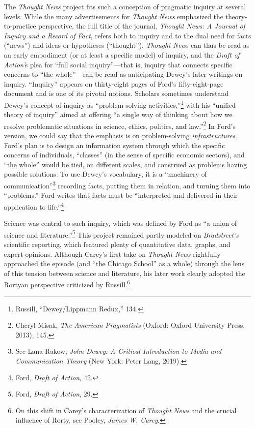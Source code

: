 \documentclass[openany,nobib]{tufte-book}
\begin{document}
The \emph{Thought News} project fits such a conception of pragmatic
inquiry at several levels. While the many advertisements for
\emph{Thought News} emphasized the theory-to-practice perspective, the
full title of the journal, \emph{Thought News: A Journal of Inquiry and
a Record of Fact}, refers both to inquiry and to the dual need for facts
(``news'') and ideas or hypotheses (``thought''). \emph{Thought New}s
can thus be read as an early embodiment (or at least a specific model)
of inquiry, and the \emph{Draft of Action'}s plea for ``full social
inquiry''---that is, inquiry that connects specific concerns to ``the
whole''---can be read as anticipating Dewey's later writings on inquiry.
``Inquiry'' appears on thirty-eight pages of Ford's fifty-eight-page
document and is one of its pivotal notions. Scholars sometimes
understand Dewey's concept of inquiry as ``problem-solving
activities,''\footnote{Russill, ``Dewey/Lippmann Redux,'' 134.} with his
``unified theory of inquiry'' aimed at offering ``a single way of
thinking about how we resolve problematic situations in science, ethics,
politics, and law.''\footnote{Cheryl Misak, \emph{The American
  Pragmatists} (Oxford: Oxford University Press, 2013), 145.} In Ford's
version, we could say that the emphasis is on problem-solving
\emph{infrastructures}. Ford's plan is to design an information system
through which the specific concerns of individuals, ``classes'' (in the
sense of specific economic sectors), and ``the whole'' would be tied, on
different scales, and construed as problems having possible solutions.
To use Dewey's vocabulary, it is a ``machinery of
communication''\footnote{See Lana Rakow, \emph{John Dewey: A Critical
  Introduction to Media and Communication Theory} (New York: Peter Lang,
  2019).} recording facts, putting them in relation, and turning them
into ``problems.'' Ford writes that facts must be ``interpreted and
delivered in their application to life.''\footnote{Ford, \emph{Draft of
  Action,} 42.}

Science was central to such inquiry, which was defined by Ford as ``a
union of science and literature.''\footnote{Ford, \emph{Draft of
  Action}, 29.} This project remained partly modeled on
\emph{Bradstreet's} scientific reporting, which featured plenty of
quantitative data, graphs, and expert opinions. Although Carey's first
take on \emph{Thought News} rightfully approached the episode (and ``the
Chicago School'' as a whole) through the lens of this tension between
science and literature, his later work clearly adopted the Rortyan
perspective criticized by Russill.\footnote{On this shift in Carey's
  characterization of \emph{Thought News} and the crucial influence of
  Rorty, see Pooley, \emph{James W. Carey}.}
\end{document}
